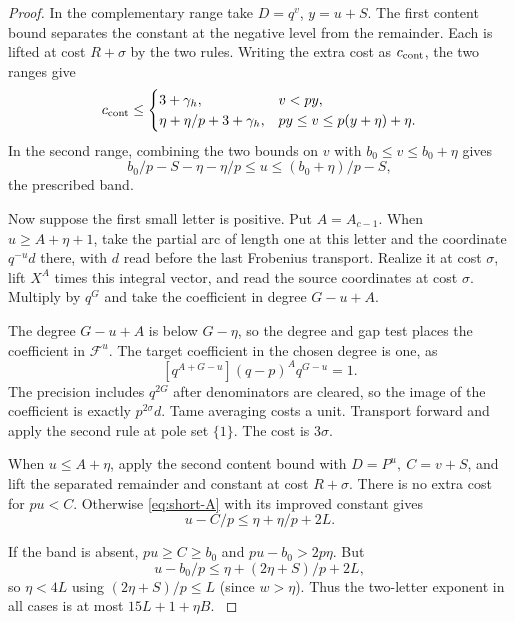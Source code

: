 \begin{proof}
In the complementary range take \(D=q^v\), \(y=u+S\). The
first content bound separates the constant at the negative level
from the remainder. Each is lifted at cost \(R+\sigma\) by the
two rules. Writing the extra cost as \(c_{\rm cont}\), the two
ranges give
\[
 c_{\rm cont}\le
 \begin{cases}
    3+\gamma_h,& v<py,\\
    \eta+\eta/p+3+\gamma_h,& py\le v\le p(y+\eta)+\eta .
 \end{cases}
\]
In the second range, combining the two bounds on \(v\) with
\(b_0\le v\le b_0+\eta\) gives
\[
 b_0/p-S-\eta-\eta/p\le u\le(b_0+\eta)/p-S,
\]
the prescribed band.

Now suppose the first small letter is positive. Put
\(A=A_{c-1}\). When \(u\ge A+\eta+1\), take the partial
arc of length one at this letter and the coordinate \(q^{-u}d\)
there, with \(d\) read before the last Frobenius transport.
Realize it at cost \(\sigma\), lift \(X^A\) times this integral
vector, and read the source coordinates at cost \(\sigma\).
Multiply by \(q^G\) and take the coefficient in degree \(G-u+A\).

The degree \(G-u+A\) is below \(G-\eta\), so the degree and gap test places the coefficient in \(\mathcal F^u\). The target coefficient in the chosen degree is one, as
\[
 [q^{A+G-u}](q-p)^A q^{G-u}=1.
\]
The precision includes \(q^{2G}\) after denominators are cleared, so the image of the coefficient is exactly \(p^{2\sigma}d\). Tame averaging costs a unit.
Transport forward and apply the second rule at pole set
\(\{1\}\). The cost is \(3\sigma\).

When \(u\le A+\eta\), apply the second content bound with
\(D=P^u,\ C=v+S\), and lift the separated remainder and
constant at cost \(R+\sigma\). There is no extra cost for
\(pu<C\). Otherwise \eqref{eq:short-A} with its improved
constant gives
\[
 u-C/p\le\eta+\eta/p+2L.
\]

If the band is absent, \(pu\ge C\ge b_0\) and
\(pu-b_0>2p\eta\). But
\[
 u-b_0/p\le \eta+(2\eta+S)/p+2L,
\]
so \(\eta<4L\) using
\((2\eta+S)/p\le L\) (since \(w>\eta\)).
Thus the two-letter exponent in all cases is at most
\(15L+1+\eta B\). \label{cor:inert-short-two-2}
\end{proof}

